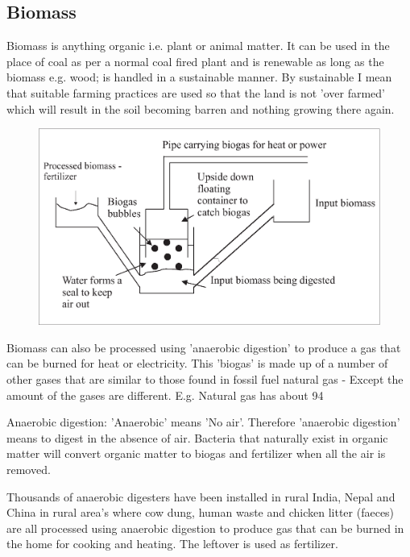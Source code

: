 \subsection*{Biomass}

Biomass is anything organic i.e. plant or animal matter. It can be
used in the place of coal as per a normal coal fired plant and is
renewable as long as the biomass e.g. wood; is handled in a
sustainable manner. By sustainable I mean that suitable farming
practices are used so that the land is not 'over farmed' which will
result in the soil becoming barren and nothing growing there again.

\begin{figure}[H]
\centering
\includegraphics[scale=0.4]{../../epsimages/6biogas.eps}
\end{figure}

Biomass can also be processed using 'anaerobic digestion' to produce a gas that can be burned for heat or electricity. This 'biogas' is made up of a number of other gases that are similar to those found in fossil fuel natural gas - Except the amount of the gases are different. E.g. Natural gas has about 94%

Anaerobic digestion: 'Anaerobic' means 'No air'. Therefore
'anaerobic digestion' means to digest in the absence of air.
Bacteria that naturally exist in organic matter will convert organic
matter to biogas and fertilizer when all the air is removed.

Thousands of anaerobic digesters have been installed in rural India,
Nepal and China in rural area's where cow dung, human waste and
chicken litter (faeces) are all processed using anaerobic digestion
to produce gas that can be burned in the home for cooking and
heating. The leftover is used as fertilizer.

